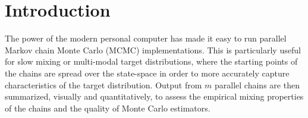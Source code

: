 \documentclass[11pt]{article}
\theoremstyle{remark}
\begin{document}







\section{Introduction} \label{sec:intro}

The power of the modern personal computer has made it easy to run parallel Markov chain Monte Carlo (MCMC) implementations. This is particularly useful for slow mixing or multi-modal target distributions, where the starting points of the chains are spread over the state-space in order to more accurately capture characteristics of the target distribution. Output from $m$ parallel chains are then summarized, visually and quantitatively, to assess the empirical mixing properties of the chains and the quality of Monte Carlo estimators.
\end{document}
